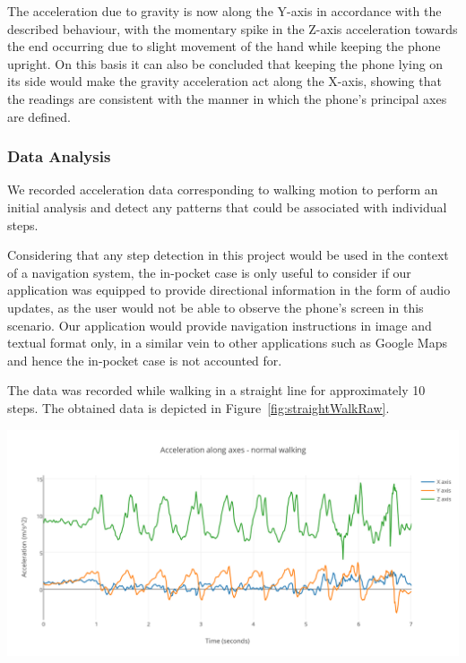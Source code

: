 \documentclass[12pt,a4paper]{report}
\begin{document}
The acceleration due to gravity is now along the Y-axis in accordance with the described behaviour, with the momentary spike in the Z-axis acceleration towards the end occurring due to slight movement of the hand while keeping the phone upright. On this basis it can also be concluded that keeping the phone lying on its side would make the gravity acceleration act along the X-axis, showing that the readings are consistent with the manner in which the phone's principal axes are defined. 
 
\subsubsection{Data Analysis}

We recorded acceleration data corresponding to walking motion to perform an initial analysis and detect any patterns that could be associated with individual steps. 

Considering that any step detection in this project would be used in the context of a navigation system, the in-pocket case is only useful to consider if our application was equipped to provide directional information in the form of audio updates, as the user would not be able to observe the phone's screen in this scenario. Our application would provide navigation instructions in image and textual format only, in a similar vein to other applications such as Google Maps and hence the in-pocket case is not accounted for.  

The data was recorded while walking in a straight line for approximately 10 steps. 
The obtained data is depicted in Figure~\ref{fig:straightWalkRaw}. 

\begin{center}
\includegraphics[scale=0.9]{images/straightWalkRaw.png}
\label{fig:straightWalkRaw}
\end{center}
\end{document}
